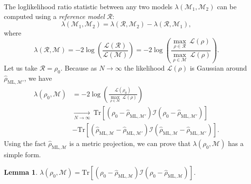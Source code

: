 \documentclass[aps,pra, twocolumn]{revtex4-1}
\newcommand{\M}{\mathcal{M}}
\newcommand{\cL}{\mathcal{L}}
\newcommand{\rhohat}{\hat{\rho}}
\newcommand{\rhoML}[1]{\rhohat_{\scriptscriptstyle{\mathrm{ML},#1}}}
\newtheorem{lem}{Lemma}
\begin{document}
The loglikelihood ratio statistic between any two models $\lambda(\M_{1}, \M_{2})$ can be computed using a \emph{reference model} $\mathcal{R}$: 
\[\lambda(\M_{1}, \M_{2}) = \lambda(\mathcal{R},\M_{2}) - \lambda(\mathcal{R},\M_{1}),\]
where
\[\lambda(\mathcal{R}, \M) = -2 \log \left(\frac{\cL(\mathcal{R})}{\cL(\M)}\right) =  -2 \log \left(\frac{\underset{\rho \in \mathcal{R}}{\max}~\cL(\rho)}{\underset{\rho \in \M}{\max}~\cL(\rho)}\right).\]
Let us take $\mathcal{R} = \rho_{0}$. Because as $N \rightarrow \infty$ the likelihood $\mathcal{L}(\rho)$ is Gaussian around $\rhoML{\M'}$, we have
\begin{align}
\label{eq:lambdalan}
\nonumber \lambda(\rho_{0}, \M)&= -2 \log \left(\frac{\cL(\rho_{0})}{\underset{\rho \in \M}{\max}~\cL(\rho)}\right)\\
\nonumber &\xrightarrow[N \rightarrow \infty]{}~\mathrm{Tr}[(\rho_{0} - \rhoML{\M'})\mathcal{I}(\rho_{0} - \rhoML{\M'})]\\
&-  \mathrm{Tr}[(\rhoML{\M} - \rhoML{\M'})\mathcal{I}(\rhoML{\M} - \rhoML{\M'})].
\end{align}
Using the fact $\rhoML{\M}$ is a metric projection, we can prove that $\lambda(\rho_{0}, \M)$ has a simple form.

\begin{lem}
$\lambda(\rho_{0}, \M) = \mathrm{Tr}[(\rho_{0} - \rhoML{\M})\mathcal{I}(\rho_{0} - \rhoML{\M})]$.
\end{lem}
\end{document}
